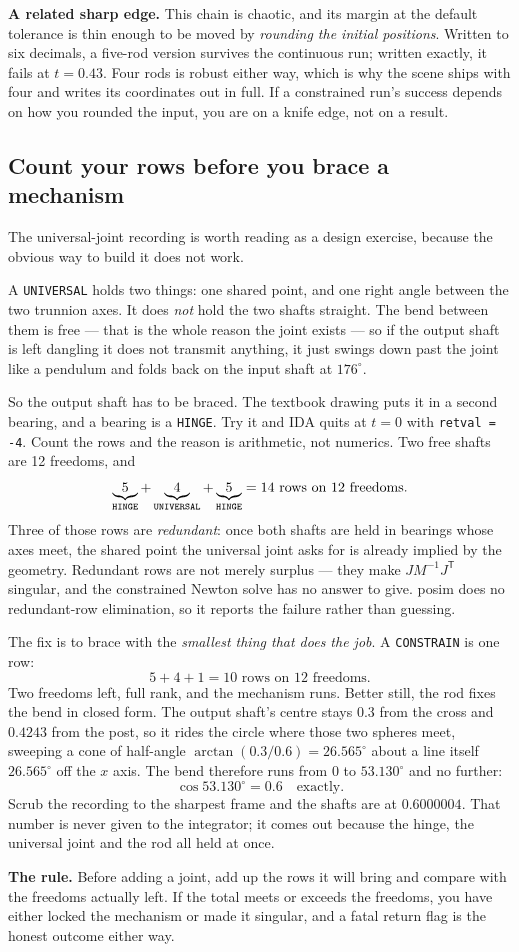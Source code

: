 \documentclass[11pt]{article}
\newcommand{\kw}[1]{\texttt{\uppercase{#1}}}
\newcommand{\code}[1]{\texttt{#1}}
\begin{document}
\textbf{A related sharp edge.} This chain is chaotic, and its margin at
the default tolerance is thin enough to be moved by \emph{rounding the
initial positions}. Written to six decimals, a five-rod version
survives the continuous run; written exactly, it fails at $t = 0.43$.
Four rods is robust either way, which is why the scene ships with four
and writes its coordinates out in full. If a constrained run's success
depends on how you rounded the input, you are on a knife edge, not on a
result.

\subsection{Count your rows before you brace a mechanism}

The universal-joint recording is worth reading as a design exercise,
because the obvious way to build it does not work.

A \kw{universal} holds two things: one shared point, and one right
angle between the two trunnion axes. It does \emph{not} hold the two
shafts straight. The bend between them is free --- that is the whole
reason the joint exists --- so if the output shaft is left dangling it
does not transmit anything, it just swings down past the joint like a
pendulum and folds back on the input shaft at $176^\circ$.

So the output shaft has to be braced. The textbook drawing puts it in a
second bearing, and a bearing is a \kw{hinge}. Try it and IDA quits at
$t=0$ with \code{retval = -4}. Count the rows and the reason is
arithmetic, not numerics. Two free shafts are 12 freedoms, and
\[
  \underbrace{5}_{\kw{hinge}} + \underbrace{4}_{\kw{universal}}
  + \underbrace{5}_{\kw{hinge}} = 14 \text{ rows on } 12 \text{ freedoms.}
\]
Three of those rows are \emph{redundant}: once both shafts are held in
bearings whose axes meet, the shared point the universal joint asks for
is already implied by the geometry. Redundant rows are not merely
surplus --- they make $J M^{-1} J^{\mathsf T}$ singular, and the
constrained Newton solve has no answer to give. posim does no
redundant-row elimination, so it reports the failure rather than
guessing.

The fix is to brace with the \emph{smallest thing that does the job}. A
\kw{constrain} is one row:
\[
  5 + 4 + 1 = 10 \text{ rows on } 12 \text{ freedoms.}
\]
Two freedoms left, full rank, and the mechanism runs. Better still, the
rod fixes the bend in closed form. The output shaft's centre stays
$0.3$ from the cross and $0.4243$ from the post, so it rides the circle
where those two spheres meet, sweeping a cone of half-angle
$\arctan(0.3/0.6) = 26.565^\circ$ about a line itself $26.565^\circ$
off the $x$ axis. The bend therefore runs from $0$ to $53.130^\circ$
and no further:
\[
  \cos 53.130^\circ = 0.6 \quad\text{exactly.}
\]
Scrub the recording to the sharpest frame and the shafts are at
$0.6000004$. That number is never given to the integrator; it comes out
because the hinge, the universal joint and the rod all held at once.

\textbf{The rule.} Before adding a joint, add up the rows it will bring
and compare with the freedoms actually left. If the total meets or
exceeds the freedoms, you have either locked the mechanism or made it
singular, and a fatal return flag is the honest outcome either way.
\end{document}

